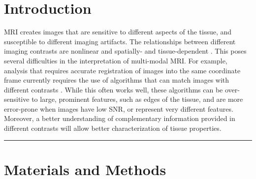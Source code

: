 \documentclass[a0, portrait]{a0poster}
\begin{document}

\begin{multicols}{2} %


\section*{Introduction}

MRI creates images that are sensitive to different aspects of the tissue, and
susceptible to different imaging artifacts. The relationships between different
imaging contrasts are nonlinear and spatially- and tissue-dependent
\cite{Vymazal1995-zo}. This poses several difficulties in the interpretation of
multi-modal MRI. For example, analysis that requires accurate registration of
images into the same coordinate frame currently requires the use of algorithms
that can match images with different contrasts \cite{Klein2009-gq}. While this
often works well, these algorithms can be over-sensitive to large, prominent
features, such as edges of the tissue, and are more error-prone when images
have low SNR, or represent very different features. Moreover, a better
understanding of complementary information provided in different contrasts will
allow better characterization of tissue properties.

\rule{\linewidth}{0.4pt}

\normalsize
\section*{Materials and Methods}


\end{multicols}
\end{document}
